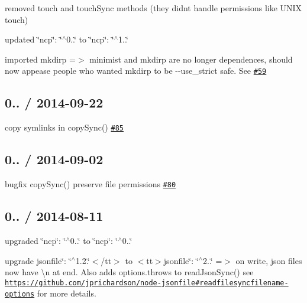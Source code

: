 \begin{DoxyItemize}
\item removed {\ttfamily touch} and {\ttfamily touch\+Sync} methods (they didn\textquotesingle{}t handle permissions like U\+N\+IX touch)
\item updated {\ttfamily \char`\"{}ncp\char`\"{}\+: \char`\"{}$^\wedge$0..\char`\"{}} to {\ttfamily \char`\"{}ncp\char`\"{}\+: \char`\"{}$^\wedge$1..\char`\"{}}
\item imported {\ttfamily mkdirp} =$>$ {\ttfamily minimist} and {\ttfamily mkdirp} are no longer dependences, should now appease people who wanted {\ttfamily mkdirp} to be {\ttfamily -\/-\/use\+\_\+strict} safe. See \href{[#59][#59]}{\tt \#59}
\end{DoxyItemize}

\subsection*{0.. / 2014-\/09-\/22 }


\begin{DoxyItemize}
\item copy symlinks in {\ttfamily copy\+Sync()} \href{https://github.com/jprichardson/node-fs-extra/pull/85}{\tt \#85}
\end{DoxyItemize}

\subsection*{0.. / 2014-\/09-\/02 }


\begin{DoxyItemize}
\item bugfix {\ttfamily copy\+Sync()} preserve file permissions \href{https://github.com/jprichardson/node-fs-extra/pull/80}{\tt \#80}
\end{DoxyItemize}

\subsection*{0.. / 2014-\/08-\/11 }


\begin{DoxyItemize}
\item upgraded {\ttfamily \char`\"{}ncp\char`\"{}\+: \char`\"{}$^\wedge$0..\char`\"{}} to {\ttfamily \char`\"{}ncp\char`\"{}\+: \char`\"{}$^\wedge$0..\char`\"{}}
\item upgrade {\ttfamily jsonfile\char`\"{}\+: \char`\"{}$^\wedge$1.2.\char`\"{}$<$/tt$>$ to $<$tt$>$jsonfile\char`\"{}\+: \char`\"{}$^\wedge$2..\char`\"{}} =$>$ on write, json files now have {\ttfamily \textbackslash{}n} at end. Also adds {\ttfamily options.\+throws} to {\ttfamily read\+Json\+Sync()} see \href{https://github.com/jprichardson/node-jsonfile#readfilesyncfilename-options}{\tt https\+://github.\+com/jprichardson/node-\/jsonfile\#readfilesyncfilename-\/options} for more details.
\end{DoxyItemize}

